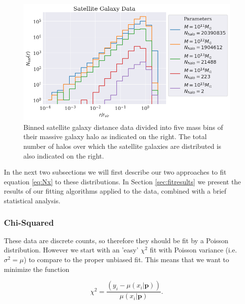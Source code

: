 \begin{figure}
    \centering
    \includegraphics[width=\textwidth]{results/satellite_data.png}
    \caption{Binned satellite galaxy distance data divided into five mass bins of their massive galaxy halo as indicated on the right. The total number of halos over which the satellite galaxies are distributed is also indicated on the right.}
    \label{fig:sat_data}
\end{figure}

In the next two subsections we will first describe our two approaches to fit equation \ref{eq:Nx} to these distributions. In Section \ref{sec:fitresults} we present the results of our fitting algorithms applied to the data, combined with a brief statistical analysis.




\subsubsection{Chi-Squared}

These data are discrete counts, so therefore they should be fit by a Poisson distribution. However we start with an 'easy' $\chi^2$ fit with Poisson variance (i.e. $\sigma^2 = \mu$) to compare to the proper unbiased fit. This means that we want to minimize the function

\begin{equation}
    \chi^2 = \frac{\left(y_i - \mu(x_i | \boldsymbol{p})\right)}{\mu(x_i | \boldsymbol{p})}.\label{eq:chi2}
\end{equation}

